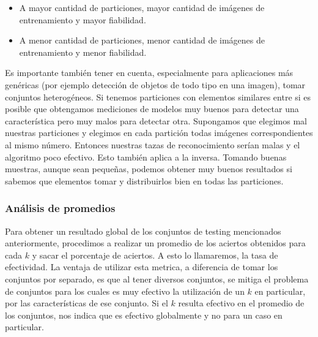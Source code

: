 \begin{itemize}
    \item A mayor cantidad de particiones, mayor cantidad de imágenes de entrenamiento y mayor fiabilidad.
    \item A menor cantidad de particiones, menor cantidad de imágenes de entrenamiento y menor fiabilidad.
\end{itemize}

Es importante también tener en cuenta, especialmente para aplicaciones más genéricas (por ejemplo detección de objetos de todo tipo en una imagen), tomar conjuntos heterogéneos. Si tenemos particiones con elementos similares entre si es posible que obtengamos mediciones de modelos muy buenos para detectar una característica pero muy malos para detectar otra. Supongamos que elegimos mal nuestras particiones y elegimos en cada partición todas imágenes correspondientes al mismo número. Entonces nuestras tazas de reconocimiento serían malas y el algoritmo poco efectivo. Esto también aplica a la inversa. Tomando buenas muestras, aunque sean pequeñas, podemos obtener muy buenos resultados si sabemos que elementos tomar y distribuirlos bien en todas las particiones.

\subsubsection{Análisis de promedios}

Para obtener un resultado global de los conjuntos de testing mencionados anteriormente, procedimos a realizar un promedio de los aciertos obtenidos para cada $k$ y sacar el porcentaje de aciertos. A esto lo llamaremos, la tasa de efectividad.
La ventaja de utilizar esta metrica, a diferencia de tomar los conjuntos por separado, es que al tener diversos conjuntos, se mitiga el problema de conjuntos para los cuales es muy efectivo la utilización de un $k$ en particular, por las características de ese conjunto. Si el $k$ resulta efectivo en el promedio de los conjuntos, nos indica que es efectivo globalmente y no para un caso en particular.

